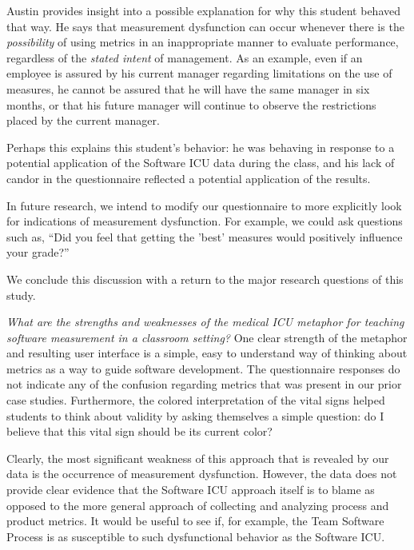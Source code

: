 \documentclass[10pt,twocolumn]{article}
\begin{document}
Austin provides insight into a possible explanation for why this student
behaved that way.  He says that measurement dysfunction can occur whenever
there is the {\em possibility} of using metrics in an inappropriate manner
to evaluate performance, regardless of the {\em stated intent} of
management.  As an example, even if an employee is assured by his current
manager regarding limitations on the use of measures, he cannot be assured
that he will have the same manager in six months, or that his future
manager will continue to observe the restrictions placed by the current
manager.

Perhaps this explains this student's behavior: he was behaving in response
to a potential application of the Software ICU data during the class, and
his lack of candor in the questionnaire reflected a potential application
of the results.

In future research, we intend to modify our questionnaire to more
explicitly look for indications of measurement dysfunction.  For example,
we could ask questions such as, ``Did you feel that getting the 'best'
measures would positively influence your grade?''


We conclude this discussion with a return to the major research questions of this study. 

{\em What are the strengths and weaknesses of the medical ICU metaphor
for teaching software measurement in a classroom setting?}  One clear
strength of the metaphor and resulting user interface is a simple, easy to
understand way of thinking about metrics as a way to guide software
development.  The questionnaire responses do not indicate any of the
confusion regarding metrics that was present in our prior case studies.
Furthermore, the colored interpretation of the vital signs helped students
to think about validity by asking themselves a simple question: do I believe
that this vital sign should be its current color?  

Clearly, the most significant weakness of this approach that is revealed by
our data is the occurrence of measurement dysfunction. However, the data
does not provide clear evidence that the Software ICU approach itself is to
blame as opposed to the more general approach of collecting and analyzing
process and product metrics.  It would be useful to see if, for example,
the Team Software Process is as susceptible to such dysfunctional behavior
as the Software ICU.
\end{document}
